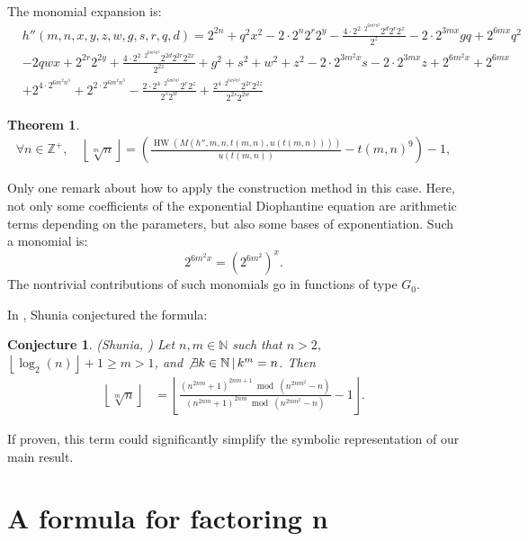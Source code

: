 \documentclass[10pt]{article}
\theoremstyle{plain}
\newtheorem{conjecture}{Conjecture}[section]
\newtheorem{theorem}{Theorem}[section]
\newcommand{\floor}[1]{\left\lfloor #1 \right\rfloor}
\newcommand{\HW}{\operatorname{HW}}
\newcommand{\Z}{\mathbb{Z}}
\begin{document}
The monomial expansion is:
\begin{align*}
& h''(m,n,x,y,z,w,g,s,r,q,d) =
2^{2  n}
+ q^{2} x^{2}
- 2 \cdot 2^{n} 2^{r} 2^{y}
- \frac{4 \cdot 2^{2 \cdot 2^{6  m^{2} n^{3}}} 2^{d} 2^{r} 2^{x}}{2^{z}}
- 2 \cdot 2^{3  m x} g q
+ 2^{6  m x} q^{2} \\
& - 2  q w x + 2^{2  r} 2^{2  y}
+ \frac{4 \cdot 2^{2 \cdot 2^{6  m^{2} n^{3}}} 2^{2  d} 2^{2  r} 2^{2  x}}{2^{2  z}}
+ g^{2}
+ s^{2}
+ w^{2}
+ z^{2}
- 2 \cdot 2^{3  m^{2} x} s
- 2 \cdot 2^{3  m x} z
+ 2^{6  m^{2} x} + 2^{6  m x} \\
& + 2^{4 \cdot 2^{6  m^{2} n^{3}}}
+ 2^{2 \cdot 2^{6  m^{2} n^{3}}}
- \frac{2 \cdot 2^{4 \cdot 2^{6  m^{2} n^{3}}} 2^{r} 2^{z}}{2^{s} 2^{w}}
+ \frac{2^{4 \cdot 2^{6  m^{2} n^{3}}} 2^{2  r} 2^{2  z}}{2^{2  s} 2^{2  w}}
\end{align*}

\begin{theorem}\label{newmrootofn}
\begin{align*}
\forall n \in \Z^+, \quad
 \left\lfloor \sqrt[m]{n} \right\rfloor = \left ( \frac{\HW(M(h'', m,  n,  t(m, n), u(t(m, n))))}{u(t(m,n))} - t(m,n)^9 \right) - 1 ,
\end{align*}
\end{theorem}

Only one remark about how to apply the construction method in this case. Here, not only some coefficients of the exponential Diophantine equation are arithmetic terms depending on the parameters, but also some bases of exponentiation. Such a monomial is:
$$ 2^{6m^2x} =  {\left( 2^{6m^2} \right ) }^x.  $$
The nontrivial contributions of such monomials go in  functions of type $G_0$.

In \cite{shunia2024polynomial}, Shunia conjectured the formula:

\begin{conjecture} (Shunia, \cite{shunia2024polynomial}) \label{proof:roots}
Let $n,m \in \mathbb{N}$ such that $n > 2$, $\floor{\log_2(n)} + 1 \geq m > 1$, and $\not\exists k \in \mathbb{N} \, | \, k^m = n$. Then
\begin{align*}
\floor{\sqrt[m]{n}}
&= \floor{\frac{(n^{2nm} + 1)^{2nm+1} \bmod{(n^{2nm^2}-n)}}{(n^{2nm} + 1)^{2nm} \bmod{ (n^{2nm^2}-n)}} - 1} .
\end{align*}
\end{conjecture}
If proven, this term could significantly simplify the symbolic representation of our main result.

\section{A formula for factoring n}\label{sectionfactoringterm}
\end{document}
